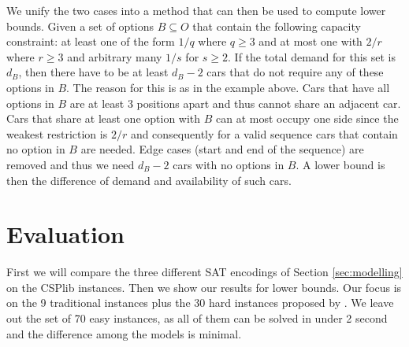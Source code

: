 \documentclass[]{llncs}
\begin{document}
We unify the two cases into a method that can then be used to compute lower bounds. Given a set of options $B\subseteq
O$ that contain the following capacity constraint: at least one of the form $1/q$ where $q \geq 3$ and at most one with
$2/r$ where $r \geq 3$ and arbitrary many $1/s$ for $s \geq 2$. If the total demand for this set is $d_B$, then there
have to be at least $d_B-2$ cars that do not require any of these options in $B$. The reason for this is as in the
example above. Cars that have all options in $B$ are at least 3 positions apart and thus cannot share an adjacent car.
Cars that share at least one option with $B$ can at most occupy one side since the weakest restriction is $2/r$ and
consequently for a valid sequence cars that contain no option in $B$ are needed. Edge cases (start and end of the
sequence) are removed and thus we need $d_B-2$ cars with no options in $B$. A lower bound is then the difference of
demand and availability of such cars. 


\section{Evaluation}
\label{sec:experiments}
                                                                      
First we will compare the three different SAT encodings of Section \ref{sec:modelling} on the CSPlib instances. Then we
show our results for lower bounds. Our focus is on the 9 traditional instances plus the 30 hard instances proposed by
\cite{Gravel05}. We leave out the set of 70 easy instances, as all of them can be solved in under 2 second and the
difference among the models is minimal. 
\end{document}
